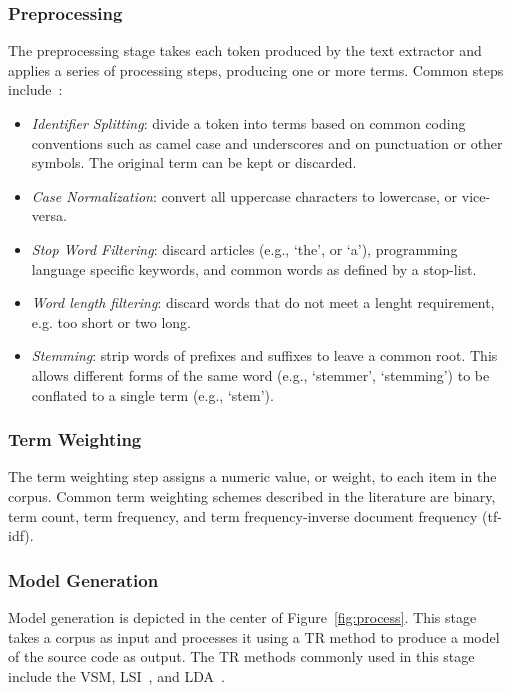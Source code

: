     \subsubsection{Preprocessing}
    The preprocessing stage takes each token produced by the text extractor
    and applies a series of processing steps, producing one or more terms.
    Common steps include~\cite{Marcus2010, Marcus2004}:
    \begin{itemize}
    \item \textit{Identifier Splitting}:
    divide a token into terms based on common coding conventions
    such as camel case and underscores
    and on punctuation or other symbols.
    The original term can be kept or discarded.
    \item \textit{Case Normalization}:
    convert all uppercase characters to lowercase, or vice-versa.
    \item \textit{Stop Word Filtering}:
    discard articles (e.g., ‘the’, or ‘a’),
    programming language specific keywords,
    and common words as defined by a stop-list.
    \item \textit{Word length filtering}:
    discard words that do not meet a lenght requirement,
    e.g. too short or two long.
    \item \textit{Stemming}:
    strip words of prefixes and suffixes to leave a common root.
    This allows different forms of the same word
    (e.g., ‘stemmer’, ‘stemming’)
    to be conflated to a single term
    (e.g., ‘stem’).
    \end{itemize}

    \subsubsection{Term Weighting}
    The term weighting step assigns a numeric value, or weight, to each item in the corpus.
    Common term weighting schemes described in the literature are
    binary, term count, term frequency, and
    term frequency-inverse document frequency (tf-idf)\needcite.


    \subsubsection{Model Generation}
    Model generation is depicted in the center of Figure~\ref{fig:process}.
    This stage takes a corpus as input and processes it using a TR method
    to produce a model of the source code as output.
    The TR methods commonly used in this stage include the VSM\needcite,
    LSI~\cite{Deerwester1990},
    and LDA~\cite{Blei2003}.

